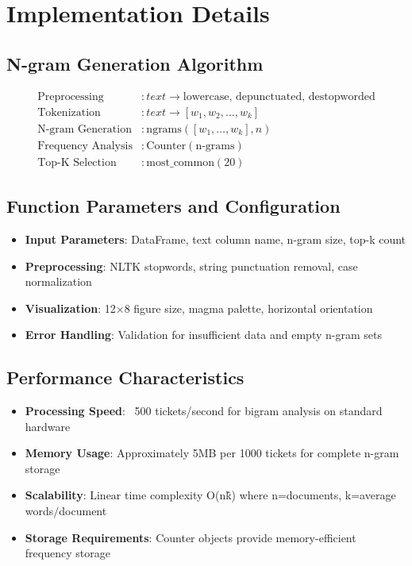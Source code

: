\documentclass[11pt]{article}
\begin{document}
\section{Implementation Details}

\subsection{N-gram Generation Algorithm}
\begin{align}
\text{Preprocessing} &: text \rightarrow \text{lowercase, depunctuated, destopworded} \\
\text{Tokenization} &: text \rightarrow [w_1, w_2, \ldots, w_k] \\
\text{N-gram Generation} &: \text{ngrams}([w_1, \ldots, w_k], n) \\
\text{Frequency Analysis} &: \text{Counter}(\text{n-grams}) \\
\text{Top-K Selection} &: \text{most\_common}(20)
\end{align}

\subsection{Function Parameters and Configuration}
\begin{itemize}
\item \textbf{Input Parameters}: DataFrame, text column name, n-gram size, top-k count
\item \textbf{Preprocessing}: NLTK stopwords, string punctuation removal, case normalization
\item \textbf{Visualization}: 12×8 figure size, magma palette, horizontal orientation
\item \textbf{Error Handling}: Validation for insufficient data and empty n-gram sets
\end{itemize}

\subsection{Performance Characteristics}
\begin{itemize}
\item \textbf{Processing Speed}: ~500 tickets/second for bigram analysis on standard hardware
\item \textbf{Memory Usage}: Approximately 5MB per 1000 tickets for complete n-gram storage
\item \textbf{Scalability}: Linear time complexity O(n\^k) where n=documents, k=average words$/$document
\item \textbf{Storage Requirements}: Counter objects provide memory-efficient frequency storage
\end{itemize}
\end{document}
